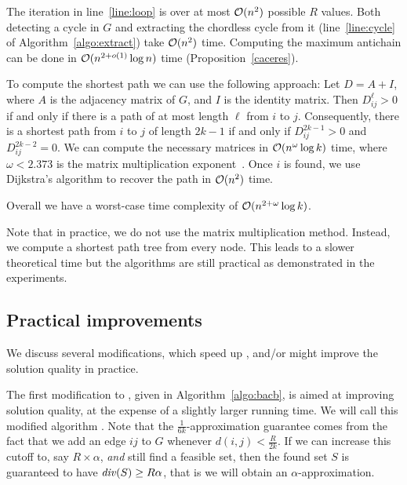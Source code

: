 The iteration in line~\ref{line:loop} is over at most $\mathcal{O}(n^2)$ possible $R$
values.
Both detecting a cycle in $G$ and extracting the chordless
cycle from it (line~\ref{line:cycle} of Algorithm~\ref{algo:extract}) take $\mathcal{O}(n^2)$ time. Computing the
maximum antichain can be done in $\mathcal{O}(n^{2 + o(1)} \log n)$ time
(Proposition~\ref{caceres}).

To compute the shortest path we can use the following approach:
Let $D = A + I$, where $A$ is the adjacency matrix of $G$,
and $I$ is the identity matrix. Then $D^\ell_{ij} > 0$ if and only if
there is a path of at most length $\ell$ from $i$ to $j$.
Consequently, there is a shortest path from $i$ to $j$ of length $2k - 1$ if and only if
$D^{2k-1}_{ij} > 0$ and $D^{2k-2}_{ij} = 0$. We can compute the necessary matrices
in $\mathcal{O}(n^{\omega}\log k)$ time, where $\omega < 2.373$ is the matrix multiplication exponent~\cite{alman2021refined}. Once $i$ is found, we use Dijkstra's algorithm to recover the path in $\mathcal{O}(n^2)$ time.

Overall we have a worst-case time complexity of $\mathcal{O}(n^{2+\omega} \log k)$.

Note that in practice, we do not use the matrix multiplication method. Instead,
we compute a shortest path tree from every node. This leads to a slower theoretical time but the algorithms
are still practical as demonstrated in the experiments.



\subsection{Practical improvements}
\label{sec:speeding}
We discuss several modifications, which speed up \algbac{}, and/or might improve the solution quality in practice. 

 The first modification to \algbac{}, given in Algorithm~\ref{algo:bacb}, is
aimed at improving solution quality, at the expense of a slightly larger
running time. We will call this modified algorithm \algbacb{}. Note that the $\frac{1}{6k}$-approximation guarantee comes from the fact
that we add an edge $ij$ to $G$ whenever $d(i, j) < \frac{R}{2k}$. If we can increase
this cutoff to, say $R \times \alpha$, \emph{and} still find a feasible set, then the found set $S$ 
is guaranteed to have $\diver{S} \geq R\alpha$, that is we will obtain an $\alpha$-approximation.


